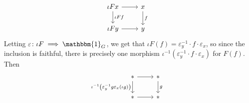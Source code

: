 \documentclass[a4paper]{article}
\theoremstyle{plain}%
\theoremstyle{definition}
\theoremstyle{remark}
\begin{document}
\begin{equation*}
\begin{tikzcd}
    \iota F x \ar[d, "\iota F f"] \ar[r] & x \ar[d, "f"] \\
    \iota F y \ar[r] & y
\end{tikzcd}
\end{equation*}
Letting $\varepsilon  \colon \iota F \implies \mathbbm{1}_{G}$, we get that
$\iota F (f) = \varepsilon_y^{-1} \cdot f \cdot  \varepsilon_x$, so since the
inclusion is faithful, there is precisely one morphism 
 $\iota^{-1} \left( \varepsilon_y^{-1} \cdot f \cdot \varepsilon_x \right)
 $ for $F(f)$.
 Then
 \begin{equation*}
 \begin{tikzcd}
     * \ar[d, "\iota^{-1} \left( \varepsilon_y^{-1} g \varepsilon_x (\iota g) \right)
     "'] \ar[r] & * \ar[d, "g"]\\
     * \ar[r] & *
 \end{tikzcd}
 \end{equation*}
 
\end{document}
